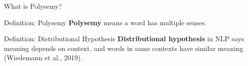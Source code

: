 % 
% 
%     
%     
%     
%     




\begin{frame}{What is Polysemy?}
      \small 
    
    \begin{definitionBlock}{Definition: Polysemy}
    \alert{\textbf{Polysemy}} means a word has multiple senses. 
    \end{definitionBlock}
    
    
    \begin{definitionBlock}{Definition: Distributional Hypothesis}
    \alert{\textbf{Distributional hypothesis}} in NLP says meaning depends on context, and words in same contexts have similar meaning (Wiedemann et al., 2019). 
    \end{definitionBlock}
\end{frame}





